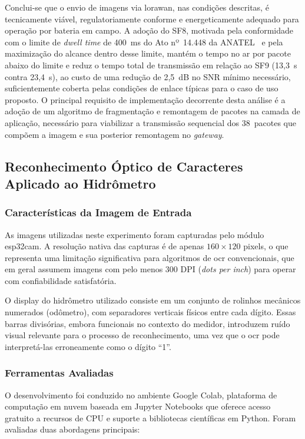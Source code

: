 Conclui-se que o envio de imagens via \gls{lorawan}, nas condições descritas, é 
tecnicamente viável, regulatoriamente conforme e energeticamente adequado
para operação por bateria em campo. A adoção do SF8, motivada pela conformidade
com o limite de \textit{dwell time} de 400~ms do Ato nº~14.448 da
ANATEL~\cite{anatel2017} e pela maximização do alcance dentro desse limite, mantém o
tempo no ar por pacote abaixo do limite e reduz o tempo total de transmissão em relação
ao SF9 (13,3~s contra 23,4~s), ao custo de uma
redução de 2,5~dB no SNR mínimo necessário, suficientemente coberta pelas condições
de enlace típicas para o caso de uso proposto. O principal requisito de implementação
decorrente desta análise é a adoção de um algoritmo de fragmentação e remontagem de
pacotes na camada de aplicação, necessário para viabilizar a transmissão sequencial
dos 38~pacotes que compõem a imagem e sua posterior remontagem no
\textit{gateway}.

\subsection{Reconhecimento Óptico de Caracteres Aplicado ao Hidrômetro}

\subsubsection{Características da Imagem de Entrada}

As imagens utilizadas neste experimento foram capturadas pelo módulo \gls{esp32cam}. A resolução nativa das capturas é de apenas $160 \times 120$ pixels, o que representa uma limitação significativa para algoritmos de \gls{ocr} convencionais, que em geral assumem imagens com pelo menos 300 DPI (\textit{dots per inch}) para operar com confiabilidade satisfatória.

O display do hidrômetro utilizado consiste em um conjunto de rolinhos mecânicos numerados (odômetro), com separadores verticais físicos entre cada dígito. Essas barras divisórias, embora funcionais no contexto do medidor, introduzem ruído visual relevante para o processo de reconhecimento, uma vez que o \gls{ocr} pode interpretá-las erroneamente como o dígito ``1''.

\subsubsection{Ferramentas Avaliadas}

O desenvolvimento foi conduzido no ambiente Google Colab, plataforma de computação em nuvem baseada em Jupyter Notebooks que oferece acesso gratuito a recursos de CPU e suporte a bibliotecas científicas em Python. Foram avaliadas duas abordagens principais:

